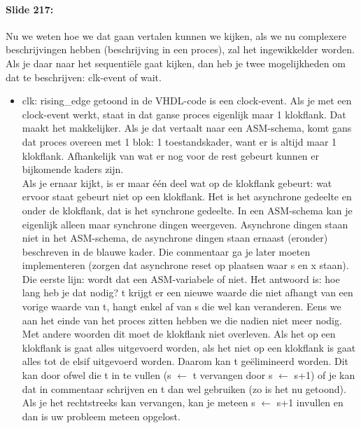 \documentclass[10pt,a4paper]{book}
\begin{document}
\paragraph{Slide 217:} Nu we weten hoe we dat gaan vertalen kunnen we kijken, als we nu complexere beschrijvingen hebben (beschrijving in een proces), zal het ingewikkelder worden. Als je daar naar het sequenti\"ele gaat kijken, dan heb je twee mogelijkheden om dat te beschrijven: clk-event of wait.	
\begin{itemize}
\item clk: rising\_edge getoond in de VHDL-code is een clock-event. Als je met een clock-event werkt, staat in dat ganse proces eigenlijk maar 1 klokflank. Dat maakt het makkelijker. Als je dat vertaalt naar een ASM-schema, komt gans dat proces overeen met 1 blok: 1 toestandskader, want er is altijd maar 1 klokflank. Afhankelijk van wat er nog voor de rest gebeurt kunnen er bijkomende kaders zijn.\\
Als je ernaar kijkt, is er maar \'e\'en deel wat op de klokflank gebeurt: wat ervoor staat gebeurt niet op een klokflank. Het is het asynchrone gedeelte en onder de klokflank, dat is het synchrone gedeelte. In een ASM-schema kan je eigenlijk alleen maar synchrone dingen weergeven. Asynchrone dingen staan niet in het ASM-schema, de asynchrone dingen staan ernaast (eronder) beschreven in de blauwe kader. Die commentaar ga je later moeten implementeren (zorgen dat asynchrone reset op plaatsen waar s en x staan). Die eerste lijn: wordt dat een ASM-variabele of niet. Het antwoord is: hoe lang heb je dat nodig? t krijgt er een nieuwe waarde die niet afhangt van een vorige waarde van t, hangt enkel af van s die wel kan veranderen. Eens we aan het einde van het proces zitten hebben we die nadien niet meer nodig. Met andere woorden dit moet de klokflank niet overleven. Als het op een klokflank is gaat alles uitgevoerd worden, als het niet op een klokflank is gaat alles tot de elsif uitgevoerd worden. Daarom kan t ge\"elimineerd worden. Dit kan door ofwel die t in te vullen (s $\leftarrow$ t vervangen door s $\leftarrow$ s+1) of je kan dat in commentaar schrijven en t dan wel gebruiken (zo is het nu getoond). Als je het rechtstreeks kan vervangen, kan je meteen s $\leftarrow$ s+1 invullen en dan is uw probleem meteen opgelost.	


\end{itemize}
\end{document}
